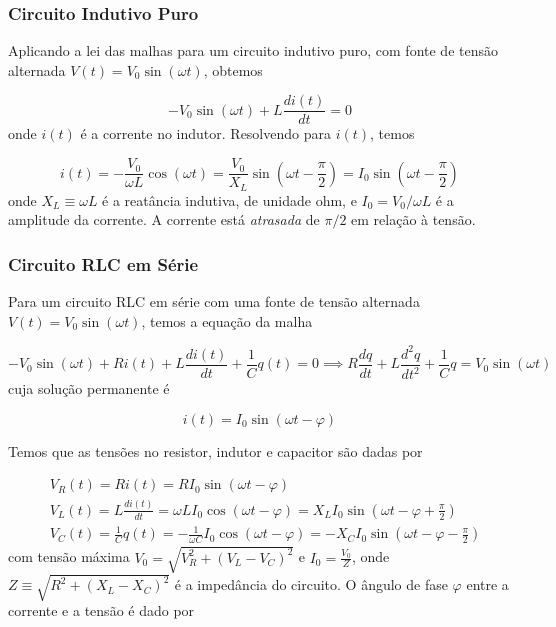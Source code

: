 \documentclass{article}
\begin{document}
\subsubsection{Circuito Indutivo Puro}

Aplicando a lei das malhas para um circuito indutivo puro, com fonte de tensão alternada \(V(t) = V_0 \sin(\omega t)\), obtemos

\begin{equation}
    - V_0 \sin(\omega t) + L \frac{di(t)}{dt} = 0
\end{equation} onde \(i(t)\) é a corrente no indutor. Resolvendo para \(i(t)\), temos

\begin{equation}
    \boxed{i(t) = -\frac{V_0}{\omega L} \cos(\omega t) = \frac{V_0}{X_L} \sin\left(\omega t - \frac{\pi}{2}\right) = I_0 \sin\left(\omega t - \frac{\pi}{2}\right)}
\end{equation} onde \(\displaystyle X_L \equiv \omega L\) é a reatância indutiva, de unidade ohm, e \(I_0 = V_0/\omega L\) é a amplitude da corrente. A corrente está \emph{atrasada} de \(\pi/2\) em relação à tensão.

\subsubsection{Circuito RLC em Série}

Para um circuito RLC em série com uma fonte de tensão alternada \(V(t) = V_0 \sin(\omega t)\), temos a equação da malha

\begin{equation}
    - V_0 \sin(\omega t) + R i(t) + L \frac{di(t)}{dt} + \frac{1}{C} q(t) = 0 \implies R\frac{dq}{dt} + L \frac{d^2q}{dt^2} + \frac{1}{C} q = V_0 \sin(\omega t)
\end{equation} cuja solução permanente é

\begin{equation}
    \boxed{i(t) = I_0 \sin(\omega t - \varphi)}
\end{equation}

Temos que as tensões no resistor, indutor e capacitor são dadas por

\begin{align}
    &V_R(t) = R i(t) = R I_0 \sin(\omega t - \varphi) \\
    &V_L(t) = L \frac{di(t)}{dt} = \omega L I_0 \cos(\omega t - \varphi) = X_L I_0 \sin\left(\omega t - \varphi + \frac{\pi}{2}\right) \\
    &V_C(t) = \frac{1}{C} q(t) = -\frac{1}{\omega C} I_0 \cos(\omega t - \varphi) = -X_C I_0 \sin\left(\omega t - \varphi - \frac{\pi}{2}\right)
\end{align} com tensão máxima \(\displaystyle V_0 = \sqrt{V_R^2 + (V_L - V_C)^2}\) e \(\displaystyle I_0 = \frac{V_0}{Z}\), onde \(Z \equiv \sqrt{R^2 + (X_L - X_C)^2}\) é a impedância do circuito. O ângulo de fase \(\varphi\) entre a corrente e a tensão é dado por
\end{document}

